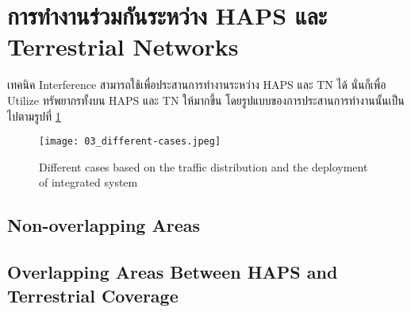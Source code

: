 \section{การทำงานร่วมกันระหว่าง HAPS และ Terrestrial Networks}

เทคนิค Interference สามารถใช้เพื่อประสานการทำงานระหว่าง HAPS และ TN ได้
นั่นก็เพื่อ Utilize ทรัพยากรทั้งบน HAPS และ TN ให้มากขึ้น
โดยรูปแบบของการประสานการทำงานนั้นเป็นไปตามรูปที่ \ref{fig:03-different-cases}

\begin{figure}[h]
\caption[Different interference cases]{Different cases based on the traffic distribution and the deployment of integrated system} \label{fig:03-different-cases}
\texttt{[image: 03\_different-cases.jpeg]}
\end{figure}

\subsection{Non-overlapping Areas}

\subsection{Overlapping Areas Between HAPS and Terrestrial Coverage}
